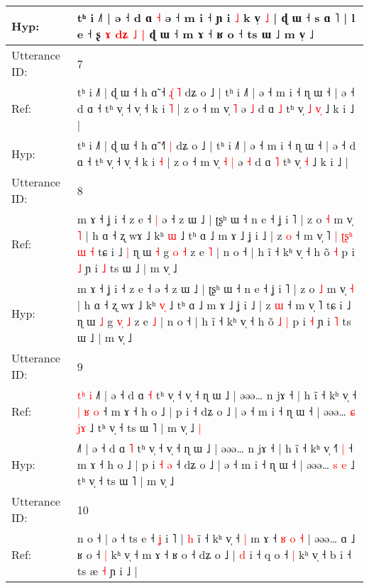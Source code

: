 \documentclass[10pt]{article}
\DeclareRobustCommand{\hl}[1]{{\textcolor{red}{#1}}}
\begin{document}
\begin{longtable}{ll}
 \\
Hyp: & tʰ i ˩˥ | ə ˧ d ɑ\hl{}\hl{} \hl{˧} ə ˧ m i ˧\hl{}\hl{} ɲ i \hl{˩} k v̩ \hl{}\hl{˩} | ɖ ɯ ˧ s ɑ ˥ | l e ˧ ʂ\hl{ }\hl{ɤ}\hl{ }\hl{d}\hl{ʑ}\hl{ }\hl{˩}\hl{ }\hl{|} ɖ ɯ ˧ m ɤ ˧ ʁ o ˧ ts ɯ ˩\hl{}\hl{} m v̩ ˩
 \\
\midrule
Utterance ID: & 7 \\
Ref: & tʰ i ˩˥ | ɖ ɯ ˧ h ɑ̃ ˧\hl{ }\hl{ɻ}\hl{̍} \hl{˥} dʑ o ˩ | tʰ i ˩˥ | ə ˧ m i ˧ ɳ ɯ ˧ | ə ˧ d ɑ ˧ tʰ v̩ ˧ v̩ ˧ k i \hl{˥} | z o ˧ m v̩\hl{}\hl{} \hl{˥} ə \hl{˩} d ɑ \hl{˩} tʰ v̩\hl{ }\hl{˩} \hl{v}\hl{̩} ˩ k i ˩ |
 \\
Hyp: & tʰ i ˩˥ | ɖ ɯ ˧ h ɑ̃ ˧\hl{}\hl{}\hl{˥} \hl{|} dʑ o ˩ | tʰ i ˩˥ | ə ˧ m i ˧ ɳ ɯ ˧ | ə ˧ d ɑ ˧ tʰ v̩ ˧ v̩ ˧ k i \hl{˧} | z o ˧ m v̩\hl{ }\hl{˧} \hl{|} ə \hl{˧} d ɑ \hl{˥} tʰ v̩\hl{}\hl{} \hl{}\hl{˧} ˩ k i ˩ |
 \\
\midrule
Utterance ID: & 8 \\
Ref: & m ɤ ˧ ʝ i ˧ z e ˧\hl{ }\hl{|} ə ˧ z ɯ ˩ | ʈʂʰ ɯ ˧ n e ˧ ʝ i ˥ | z o \hl{˧} m v̩ \hl{˥} | h ɑ ˧ ʐ wɤ ˩ kʰ \hl{}\hl{ɯ} ˩ tʰ ɑ ˩ m ɤ ˩ ʝ i ˩ | z \hl{o} ˧ m v̩ ˥\hl{ }\hl{|}\hl{ }\hl{ʈ}\hl{ʂ}\hl{ʰ}\hl{ }\hl{ɯ}\hl{ }\hl{˧} tɕ i ˩\hl{ }\hl{|} ɳ ɯ \hl{˧} g \hl{}\hl{o} \hl{˧} z e \hl{˥} | n o ˧ | h ĩ ˧ kʰ v̩ ˧ h õ\hl{}\hl{} \hl{˧} p i \hl{˩} ɲ i \hl{˩} ts ɯ ˩ | m v̩ ˩
 \\
Hyp: & m ɤ ˧ ʝ i ˧ z e ˧\hl{}\hl{} ə ˧ z ɯ ˩ | ʈʂʰ ɯ ˧ n e ˧ ʝ i ˥ | z o \hl{˩} m v̩ \hl{˧} | h ɑ ˧ ʐ wɤ ˩ kʰ \hl{v}\hl{̩} ˩ tʰ ɑ ˩ m ɤ ˩ ʝ i ˩ | z \hl{ɯ} ˧ m v̩ ˥\hl{}\hl{}\hl{}\hl{}\hl{}\hl{}\hl{}\hl{}\hl{}\hl{} tɕ i ˩\hl{}\hl{} ɳ ɯ \hl{˩} g \hl{v}\hl{̩} \hl{˩} z e \hl{˩} | n o ˧ | h ĩ ˧ kʰ v̩ ˧ h õ\hl{ }\hl{˩} \hl{|} p i \hl{˧} ɲ i \hl{˥} ts ɯ ˩ | m v̩ ˩
 \\
\midrule
Utterance ID: & 9 \\
Ref: & \hl{t}\hl{ʰ}\hl{ }\hl{i}\hl{ }˩˥ | ə ˧ d ɑ \hl{˧} tʰ v̩ ˧ v̩ ˧ ɳ ɯ ˩ | əəə… n jɤ ˧ | h ĩ ˧ kʰ v̩ ˧\hl{ }\hl{|}\hl{ }\hl{ʁ} \hl{o} ˧ m ɤ ˧ h o ˩ | p i\hl{}\hl{}\hl{}\hl{} ˧ dʑ o ˩ | ə ˧ m i ˧ ɳ ɯ ˧ | əəə… \hl{ɕ} \hl{j}\hl{ɤ} ˩ tʰ v̩ ˧ ts ɯ ˥ | m v̩ ˩\hl{ }\hl{|}
 \\
Hyp: & \hl{}\hl{}\hl{}\hl{}\hl{}˩˥ | ə ˧ d ɑ \hl{˥} tʰ v̩ ˧ v̩ ˧ ɳ ɯ ˩ | əəə… n jɤ ˧ | h ĩ ˧ kʰ v̩ ˧\hl{}\hl{}\hl{}\hl{˥} \hl{|} ˧ m ɤ ˧ h o ˩ | p i\hl{ }\hl{˧}\hl{ }\hl{ə} ˧ dʑ o ˩ | ə ˧ m i ˧ ɳ ɯ ˧ | əəə… \hl{s} \hl{}\hl{e} ˩ tʰ v̩ ˧ ts ɯ ˥ | m v̩ ˩\hl{}\hl{}
 \\
\midrule
Utterance ID: & 10 \\
Ref: & n o ˧ | ə ˧ ts e ˧\hl{ }\hl{ʝ} i ˥ | \hl{h} i\hl{̃} ˧ kʰ v̩ ˧\hl{ }\hl{|} m ɤ ˧ \hl{ʁ}\hl{ }\hl{o} \hl{˧} | əəə… ɑ ˩ ʁ o ˧\hl{ }\hl{|} kʰ v̩ ˧ m ɤ ˧ ʁ o ˧ dʑ o ˩ | \hl{d} i ˧ q o ˧\hl{ }\hl{|} kʰ v̩ ˧ b i ˧ ts æ \hl{˧} ɲ i ˩ |

\end{longtable}
\end{document}
